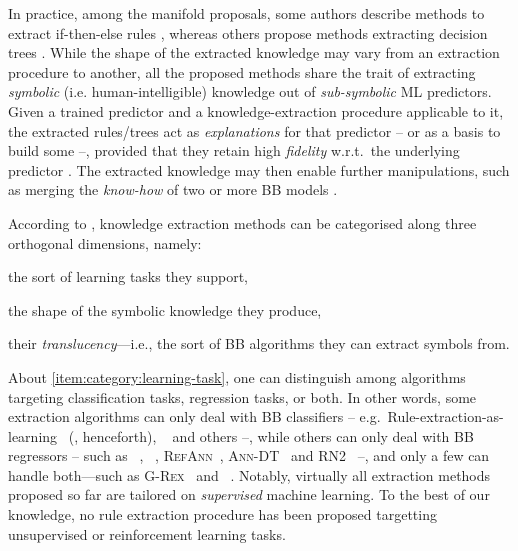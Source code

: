 \documentclass[12pt,a4paper,openright,twoside]{book}
\begin{document}
In practice, among the manifold proposals, some authors describe methods to extract if-then-else rules \cite{CravenS94,HuysmansBV2006,gridex-extraamas2021}, whereas others propose methods extracting decision trees \cite{Craven1996}.
%
While the shape of the extracted knowledge may vary from an extraction procedure to another, all the proposed methods share the trait of extracting \emph{symbolic} (i.e. human-intelligible) knowledge out of \emph{sub-symbolic} ML predictors.
%
Given a trained predictor and a knowledge-extraction procedure applicable to it, the extracted rules/trees act as \emph{explanations} for that predictor -- or as a basis to build some --, provided that they retain high \emph{fidelity} w.r.t.\ the underlying predictor \cite{agentbasedxai-aamas2020}.
%
The extracted knowledge may then enable further manipulations, such as merging the \emph{know-how} of two or more BB models \cite{xmas-aiiot2019}.

According to \cite{xaisurvey-ia14}, knowledge extraction methods can be categorised along three orthogonal dimensions, namely:
%
\begin{inlinelist}
    \item\label{item:category:learning-task} the sort of learning tasks they support,
    \item\label{item:category:knowledge-form} the shape of the symbolic knowledge they produce,
    \item\label{item:category:translucency} their \emph{translucency}---i.e., the sort of BB algorithms they can extract symbols from.
\end{inlinelist}

About \cref{item:category:learning-task}, one can distinguish among algorithms targeting classification tasks, regression tasks, or both.
%
In other words, some extraction algorithms can only deal with BB classifiers -- e.g.\ Rule-extraction-as-learning~\cite{CravenS94} (\real, henceforth), \trepan~\cite{Craven1996} and others \cite{BarakatD2005,MartensBVGV2007} --, while others can only deal with BB regressors -- such as \iter~\cite{HuysmansBV2006}, \gridex~\cite{gridex-extraamas2021}, \textsc{RefAnn}~\cite{SetionoLZ2002}, \textsc{Ann-DT}~\cite{schmitz1999ann} and \textsc{RN2}~\cite{saito2002extracting} --, and only a few can handle both---such as \textsc{G-Rex}~\cite{grex-icdm2008} and \cart~\cite{breiman1984classification}.
%
Notably, virtually all extraction methods proposed so far are tailored on \emph{supervised} machine learning.
%
To the best of our knowledge, no rule extraction procedure has been proposed targetting unsupervised or reinforcement learning tasks.
\end{document}
